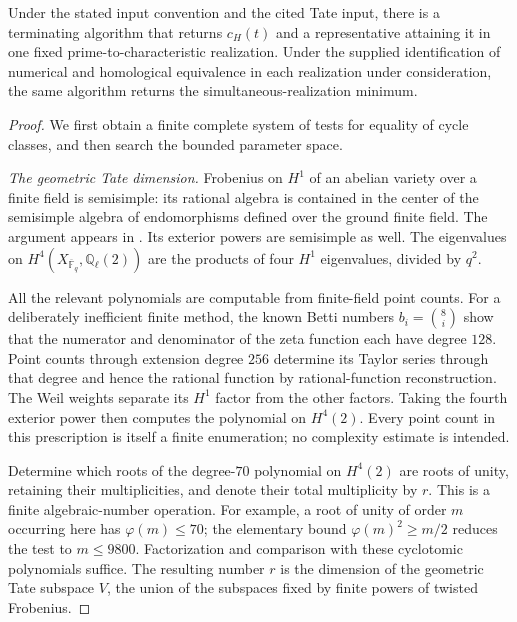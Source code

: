 \begin{theorem}
\label{thm:R40}
Under the stated input convention and the cited Tate input, there is a
terminating algorithm that returns $c_H(t)$ and a representative
attaining it in one fixed prime-to-characteristic realization. Under
the supplied identification of numerical and homological equivalence
in each realization under consideration, the same algorithm returns
the simultaneous-realization minimum.
\end{theorem}
\begin{proof}
We first obtain a finite complete system of tests for equality of cycle
classes, and then search the bounded parameter space.

\emph{The geometric Tate dimension.}
Frobenius on $H^1$ of an abelian variety over a finite field is
semisimple: its rational algebra is contained in the center of the
semisimple algebra of endomorphisms defined over the ground finite
field. The argument appears in
\cite[\S2, pp.~138--139; Theorem 2(a), p.~140]{Tate1966}.
Its exterior powers are semisimple as well. The eigenvalues on
$H^4(X_{\overline{\mathbb F}_q},\mathbb Q_\ell(2))$ are the products
of four $H^1$ eigenvalues, divided by $q^2$.

All the relevant polynomials are computable from finite-field point
counts. For a deliberately inefficient finite method, the known Betti
numbers $b_i=\binom8i$ show that the numerator and denominator of the
zeta function each have degree $128$. Point counts through extension
degree $256$ determine its Taylor series through that degree and hence
the rational function by rational-function reconstruction. The Weil
weights separate its $H^1$ factor from the other factors. Taking the
fourth exterior power then computes the polynomial on $H^4(2)$.
Every point count in this prescription is itself a finite enumeration;
no complexity estimate is intended.

Determine which roots of the degree-$70$ polynomial on $H^4(2)$ are
roots of unity, retaining their multiplicities, and denote their total
multiplicity by $r$. This is a finite algebraic-number operation. For
example, a root of unity of order $m$ occurring here has
$\varphi(m)\leq70$; the elementary bound
$\varphi(m)^2\geq m/2$ reduces the test to $m\leq9800$.
Factorization and comparison with these cyclotomic polynomials suffice.
The resulting number $r$ is the dimension of the geometric Tate
subspace $V$, the union of the subspaces fixed by finite powers of
twisted Frobenius.


\end{proof}
